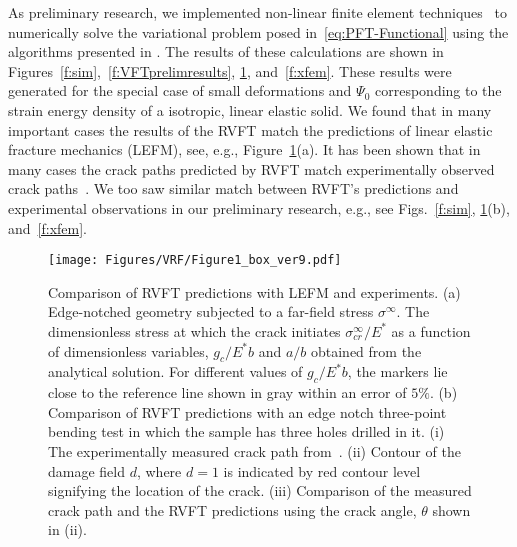\documentclass[10pt,letterpaper]{article}
\begin{document}
As preliminary research, we implemented non-linear finite element techniques~\cite{belytschko2013nonlinear} to numerically solve the variational problem posed in~\eqref{eq:PFT-Functional} using the algorithms presented in \cite{borden2012phase}. The results of these calculations are shown in Figures~\ref{f:sim},~\ref{f:VFTprelimresults}, \ref{f:VFTvalidation}, and~\ref{f:xfem}. These results were generated for the special case of small deformations and $\Psi_0$ corresponding to the strain energy density of a  isotropic, linear elastic solid. We found that in many important cases the results of the RVFT match the predictions of linear elastic fracture mechanics (LEFM), see, e.g.,  Figure~\ref{f:VFTvalidation}(a). It has  been shown that in many cases the crack paths predicted by RVFT match experimentally observed crack paths~\cite{miehe2010phase,borden2012phase,dally2015phase}. We too saw similar match between  RVFT's predictions and experimental observations in our preliminary research, e.g., see Figs.~\ref{f:sim}, \ref{f:VFTvalidation}(b), and~\ref{f:xfem}.




    \begin{figure}[b!]
      \centering
      \texttt{[image: Figures/VRF/Figure1\_box\_ver9.pdf]}
      \caption{\footnotesize Comparison of RVFT predictions with LEFM and experiments. (a) Edge-notched geometry subjected to a far-field stress $\sigma^\infty$. The dimensionless stress at which the crack initiates $\sigma^\infty_{cr}/E^*$ as a function of dimensionless variables, $g_c/E^*b$ and $a/b$ obtained from the analytical solution. For different values of $g_c/E^*b$, the markers lie close to the reference line shown in gray within an error of $5\%$. (b) Comparison of RVFT predictions with an edge notch three-point bending test in which the sample has three holes drilled in it. (i) The experimentally measured crack path from~\cite{bittencourt_1996}. (ii) Contour of the damage field $d$, where $d=1$ is indicated by red contour level signifying the location of the crack. (iii) Comparison of the measured crack path and the RVFT predictions using the crack angle, $\theta$ shown in (ii).}
      \label{f:VFTvalidation}
    \end{figure}
\end{document}
